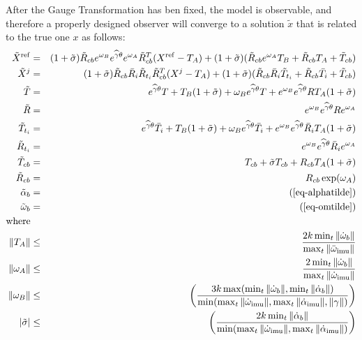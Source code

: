 \documentclass[]{article}
\def\w{\omega}
\def\Xw{\tilde{X}}
\def\imu{_\mathrm{imu}}
\begin{document}
After the Gauge Transformation has ben fixed, the model is observable, and therefore a properly designed observer will converge to a solution $\tilde x$ that is related to the true one $x$ as follows: 
\begin{eqnarray}
{\Xw}^{\rm ref} &=&   (1+\tilde  \sigma)\tilde R_{cb} e^{\w_B} e^{\widehat \gamma \theta}e^{\w_A} \tilde R_{cb}^T (X^{\rm ref}-T_A) +(1+\tilde \sigma)( \tilde R_{cb} e^{\w_A}T_B + \tilde R_{cb} T_A + \tilde T_{cb})  \\
{\Xw}^j &=&   (1+\tilde  \sigma)\tilde R_{cb} \bar R_i \tilde R_{t_i}  \tilde R_{cb}^T (X^{j}-T_A) +(1+\tilde \sigma)( \tilde R_{cb} \bar R_i \tilde T_{t_i} + \tilde R_{cb} \bar T_{i} + \tilde T_{cb}) \\
\tilde T %
&=& e^{\widehat \gamma \theta} T + T_B (1+\tilde\sigma) + \w_Be^{\widehat \gamma \theta} T + e^{\w_B} e^{\widehat \gamma \theta}R T_A(1+\tilde \sigma) \\
\tilde R &=&  e^{\w_B}e^{\widehat \gamma \theta} R e^{\w_A}\\
\tilde T_{t_i} &=&  e^{\widehat \gamma \theta} \bar T_{i} + T_B (1+\tilde\sigma) + \w_Be^{\widehat \gamma \theta} \bar T_{i} + e^{\w_B} e^{\widehat \gamma \theta}\bar R_{i} T_A(1+\tilde \sigma)\\
\tilde R_{t_i} &=&  e^{\w_B}e^{\widehat \gamma \theta} \bar R_{i} e^{\w_A}\\
\tilde T_{cb} &=&  T_{cb} + \tilde \sigma T_{cb} + R_{cb}T_A(1+ \tilde \sigma) \\
\tilde R_{cb} &=&  R_{cb}\exp(\w_A)\\
\tilde \alpha_b &=&  (\ref{eq-alphatilde}) \nonumber  \\
\tilde \w_b &=& (\ref{eq-omtilde}) \nonumber \\
{\rm where} & &  \nonumber \\
\| T_A \| &\le& \frac{2 k \min_t \| \dot \w_b \| }{\max_t \| \ddot \w\imu  \|}  \nonumber \\
\| \w_A \| &\le& \frac{2 \min_t \| \dot \w_b \|}{\max_t \| \dot \w\imu  \|} \nonumber  \\
 \| \w_B \| &\le& \left(\frac{3k\max(\min_t \|\dot \w_b\|, \min_t \|\dot \alpha_b\| )}{\min(\max_t \| \dot \w\imu  \|, \max_t \| \dot \alpha\imu  \|, \| \gamma \|)}\right) \nonumber \\
| \tilde \sigma | &\le& \left(\frac{2k\min_t \| \dot \alpha_b \|}{\min(\max_t \| \dot \w\imu  \|, \max_t \| \dot \alpha\imu  \|)}\right) \nonumber
\end{eqnarray}
\end{document}

